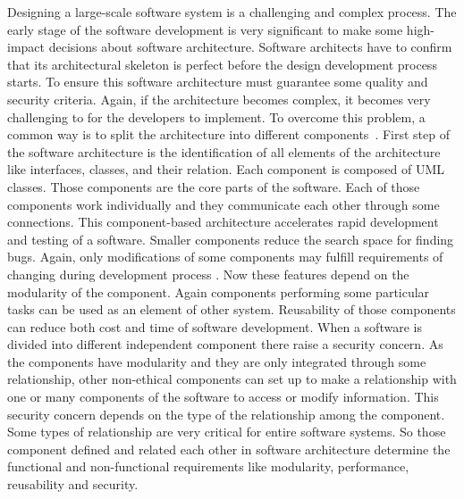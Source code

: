 \documentclass[letterpaper, 10 pt, conference]{ieeeconf}  %
\begin{document}
Designing a large-scale software system is a challenging and complex process. 
The early stage of the software development is very significant to make some high-impact decisions about software architecture. Software architects have to confirm that its architectural skeleton is perfect before the design development process starts. To ensure this software architecture must guarantee some quality and security criteria.
Again, if the architecture becomes complex, it becomes very challenging to for the developers to implement. To overcome this problem, a common way is to split the architecture into different components~\cite{szyperski1999component}. First step of the software architecture is the  identification of  all elements of the architecture like interfaces, classes, and their relation. Each component is composed of UML classes. Those components are the core parts of the software. Each of those components work individually and they communicate each other through some connections. This component-based architecture accelerates rapid development and testing of a software. Smaller components
reduce the search space for finding bugs. Again, only modifications of some components may fulfill requirements of changing during development process . Now these features depend on the modularity of the component. Again components performing some particular tasks  can be used as an element of other system. Reusability of those components can reduce both cost and time of software development. When a software is divided into different independent component there raise a security concern. As the components have modularity and they are only integrated through some relationship, other non-ethical components can set up to make a relationship with one or many components of the software to access or modify information. This security concern depends on the type of the relationship among the component. Some types of relationship are very critical for entire software systems. So those component defined and related each other in software architecture determine the functional and non-functional requirements like modularity, performance, reusability and security. \\
\end{document}
